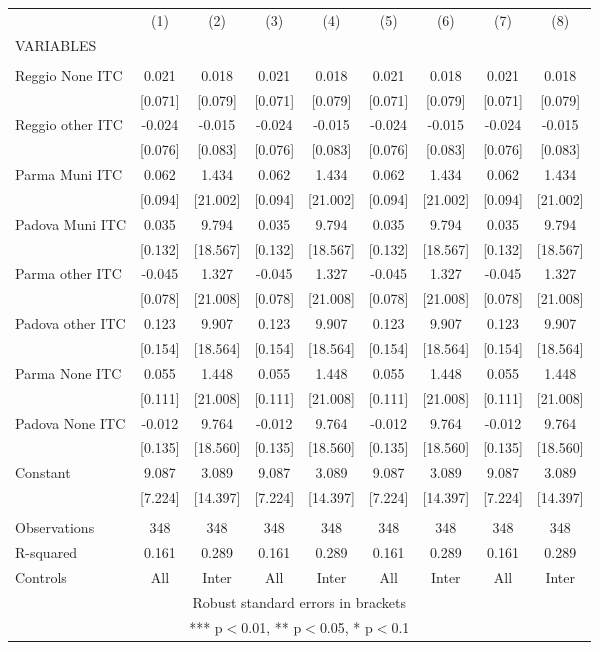 \begin{tabular}{lcccccccc} \hline
 & (1) & (2) & (3) & (4) & (5) & (6) & (7) & (8) \\
VARIABLES &  &  &  &  &  &  &  &  \\ \hline
 &  &  &  &  &  &  &  &  \\
Reggio None ITC & 0.021 & 0.018 & 0.021 & 0.018 & 0.021 & 0.018 & 0.021 & 0.018 \\
 & [0.071] & [0.079] & [0.071] & [0.079] & [0.071] & [0.079] & [0.071] & [0.079] \\
Reggio other ITC & -0.024 & -0.015 & -0.024 & -0.015 & -0.024 & -0.015 & -0.024 & -0.015 \\
 & [0.076] & [0.083] & [0.076] & [0.083] & [0.076] & [0.083] & [0.076] & [0.083] \\
Parma Muni ITC & 0.062 & 1.434 & 0.062 & 1.434 & 0.062 & 1.434 & 0.062 & 1.434 \\
 & [0.094] & [21.002] & [0.094] & [21.002] & [0.094] & [21.002] & [0.094] & [21.002] \\
Padova Muni ITC & 0.035 & 9.794 & 0.035 & 9.794 & 0.035 & 9.794 & 0.035 & 9.794 \\
 & [0.132] & [18.567] & [0.132] & [18.567] & [0.132] & [18.567] & [0.132] & [18.567] \\
Parma other ITC & -0.045 & 1.327 & -0.045 & 1.327 & -0.045 & 1.327 & -0.045 & 1.327 \\
 & [0.078] & [21.008] & [0.078] & [21.008] & [0.078] & [21.008] & [0.078] & [21.008] \\
Padova other ITC & 0.123 & 9.907 & 0.123 & 9.907 & 0.123 & 9.907 & 0.123 & 9.907 \\
 & [0.154] & [18.564] & [0.154] & [18.564] & [0.154] & [18.564] & [0.154] & [18.564] \\
Parma None ITC & 0.055 & 1.448 & 0.055 & 1.448 & 0.055 & 1.448 & 0.055 & 1.448 \\
 & [0.111] & [21.008] & [0.111] & [21.008] & [0.111] & [21.008] & [0.111] & [21.008] \\
Padova None ITC & -0.012 & 9.764 & -0.012 & 9.764 & -0.012 & 9.764 & -0.012 & 9.764 \\
 & [0.135] & [18.560] & [0.135] & [18.560] & [0.135] & [18.560] & [0.135] & [18.560] \\
Constant & 9.087 & 3.089 & 9.087 & 3.089 & 9.087 & 3.089 & 9.087 & 3.089 \\
 & [7.224] & [14.397] & [7.224] & [14.397] & [7.224] & [14.397] & [7.224] & [14.397] \\
 &  &  &  &  &  &  &  &  \\
Observations & 348 & 348 & 348 & 348 & 348 & 348 & 348 & 348 \\
R-squared & 0.161 & 0.289 & 0.161 & 0.289 & 0.161 & 0.289 & 0.161 & 0.289 \\
 Controls & All & Inter & All & Inter & All & Inter & All & Inter \\ \hline
\multicolumn{9}{c}{ Robust standard errors in brackets} \\
\multicolumn{9}{c}{ *** p$<$0.01, ** p$<$0.05, * p$<$0.1} \\
\end{tabular}
